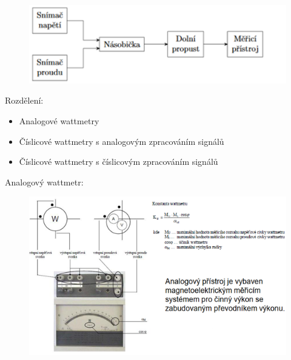 \begin{figure}[H]
    \includegraphics*[scale  = 1]{images/wattPruchozi.png}
\end{figure}

Rozdělení:
\begin{itemize}
    \item Analogové wattmetry
    \item Číslicové wattmetry s analogovým zpracováním signálů
    \item Číslicové wattmetry s číslicovým zpracováním signálů
\end{itemize}

Analogový wattmetr:
\begin{figure}[H]
    \includegraphics*[scale  = 1.3]{images/wattAnalog.png}
\end{figure}

